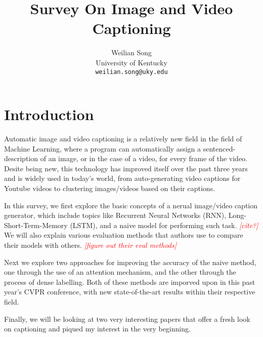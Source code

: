 \documentclass[10pt,twocolumn,letterpaper]{article}
\newcommand{\todo}[1]{\textcolor{red}{{\em [#1]}} }
\begin{document}
\title{Survey On Image and Video Captioning}

\author{Weilian Song\\
University of Kentucky\\
{\tt\small weilian.song@uky.edu}
}

\maketitle

\section{Introduction}

Automatic image and video captioning is a relatively new field in the field of
Machine Learning, where a program can automatically assign a
sentenced-description of an image, or in the case of a video, for every frame
of the video. Desite being new, this technology has improved itself over the
past three years and is widely used in today's world, from auto-generating
video captions for Youtube videos to clustering images/videos based on their
captions.

In this survey, we first explore the basic concepts of a nerual image/video
caption generator, which include topics like Recurrent Neural Networks (RNN),
Long-Short-Term-Memory (LSTM), and a naive model for performing such task.
\todo{cite?} We will also explain various evaluation methods that authors use
to compare their models with others. \todo{figure out their eval methods}

Next we explore two approaches for improving the accuracy of the naive method,
one through the use of an attention mechanism, and the other through the
process of dense labelling. Both of these methods are imporved upon in this
past year's CVPR conference, with new state-of-the-art results within their
respective field.

Finally, we will be looking at two very interesting papers that offer a fresh
look on captioning and piqued my interest in the very beginning.

\end{document}

